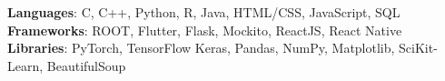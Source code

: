    \begin{itemize}[leftmargin=0.15in, label={}] 
    \small{\item{
      \textbf{Languages}: C, C++, Python, R, Java, HTML/CSS, JavaScript, SQL\\
      \textbf{Frameworks}: ROOT, Flutter, Flask, Mockito, ReactJS, React Native\\
      \textbf{Libraries}: PyTorch, TensorFlow Keras, Pandas, NumPy, Matplotlib, SciKit-Learn, BeautifulSoup
       }}
\end{itemize}